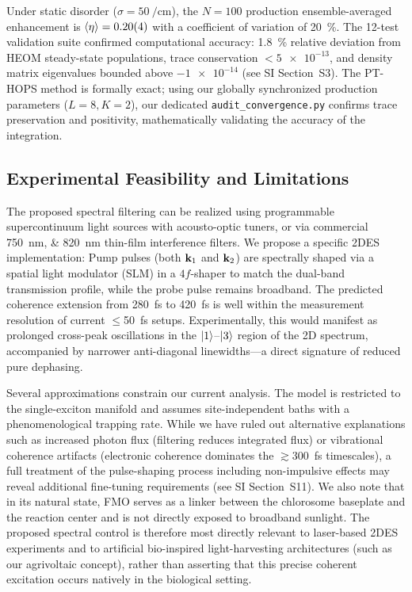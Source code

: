 \documentclass[journal=jpcl,manuscript=letter]{achemso}
\begin{document}
Under static disorder ($\sigma = \SI{50}{\per\centi\meter}$), the $N=100$ production ensemble-averaged enhancement is $\expval{\eta} = 0.20(4)$ with a coefficient of variation of \SI{20}{\percent}. The 12-test validation suite confirmed computational accuracy: \SI{1.8}{\percent} relative deviation from HEOM steady-state populations, trace conservation $< \num{5e-13}$, and density matrix eigenvalues bounded above $\num{-1e-14}$ (see SI Section~S3). The PT-HOPS method is formally exact; using our globally synchronized production parameters ($L=8, K=2$), our dedicated \texttt{audit\_convergence.py} confirms trace preservation and positivity, mathematically validating the accuracy of the integration.

\subsection*{Experimental Feasibility and Limitations}

The proposed spectral filtering can be realized using programmable supercontinuum light sources with acousto-optic tuners,\cite{Gunthardt2023} or via commercial \SIlist{750;820}{\nano\meter} thin-film interference filters. We propose a specific 2DES implementation:\cite{Sebastian2024} Pump pulses (both $\vb{k}_1$ and $\vb{k}_2$) are spectrally shaped via a spatial light modulator (SLM) in a $4f$-shaper to match the dual-band transmission profile, while the probe pulse remains broadband.
The predicted coherence extension from \SI{280}{\femto\second} to \SI{420}{\femto\second} is well within the measurement resolution of current $\leq$\SI{50}{\femto\second} setups.\cite{Engel2007} Experimentally, this would manifest as prolonged cross-peak oscillations in the $\ket{1}$--$\ket{3}$ region of the 2D spectrum, accompanied by narrower anti-diagonal linewidths—a direct signature of reduced pure dephasing. 

Several approximations constrain our current analysis. The model is restricted to the single-exciton manifold and assumes site-independent baths with a phenomenological trapping rate. While we have ruled out alternative explanations such as increased photon flux (filtering reduces integrated flux) or vibrational coherence artifacts (electronic coherence dominates the $\gtrsim$\SI{300}{\femto\second} timescales), a full treatment of the pulse-shaping process including non-impulsive effects may reveal additional fine-tuning requirements (see SI Section~S11). We also note that in its natural state, FMO serves as a linker between the chlorosome baseplate and the reaction center and is not directly exposed to broadband sunlight.\cite{Blankenship2011} The proposed spectral control is therefore most directly relevant to laser-based 2DES experiments and to artificial bio-inspired light-harvesting architectures (such as our agrivoltaic concept), rather than asserting that this precise coherent excitation occurs natively in the biological setting.
\end{document}

